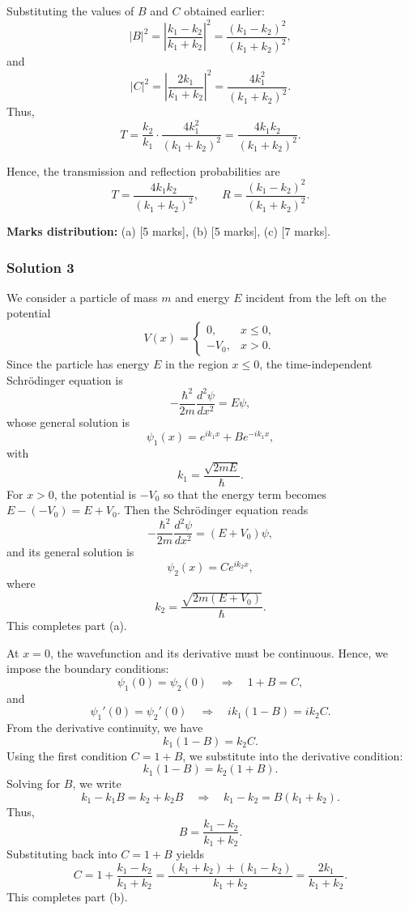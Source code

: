 \documentclass{article}
\begin{document}
Substituting the values of \(B\) and \(C\) obtained earlier:
\[
|B|^2 = \left|\frac{k_1-k_2}{k_1+k_2}\right|^2 = \frac{(k_1-k_2)^2}{(k_1+k_2)^2},
\]
and
\[
|C|^2 = \left|\frac{2k_1}{k_1+k_2}\right|^2 = \frac{4k_1^2}{(k_1+k_2)^2}.
\]
Thus,
\[
T = \frac{k_2}{k_1}\cdot\frac{4k_1^2}{(k_1+k_2)^2} = \frac{4k_1k_2}{(k_1+k_2)^2}.
\]

Hence, the transmission and reflection probabilities are
\[
T = \frac{4k_1k_2}{(k_1+k_2)^2}, \qquad R = \frac{(k_1-k_2)^2}{(k_1+k_2)^2}.
\]

\textbf{Marks distribution:} \quad (a) [5 marks], (b) [5 marks], (c) [7 marks].

\subsubsection{Solution 3}

We consider a particle of mass \( m \) and energy \( E \) incident from the left on the potential
\[
V(x)=
\begin{cases}
0, & x\le 0,\\[1mm]
-V_0, & x>0.
\end{cases}
\]
Since the particle has energy \( E \) in the region \( x\le 0 \), the time-independent Schrödinger equation is
\[
-\frac{\hbar^2}{2m}\frac{d^2\psi}{dx^2} = E\psi,
\]
whose general solution is
\[
\psi_1(x)=e^{ik_1x}+Be^{-ik_1x},
\]
with
\[
k_1 = \frac{\sqrt{2mE}}{\hbar}.
\]
For \( x>0 \), the potential is \( -V_0 \) so that the energy term becomes \( E - (-V_0)=E+V_0 \). Then the Schrödinger equation reads
\[
-\frac{\hbar^2}{2m}\frac{d^2\psi}{dx^2} = (E+V_0)\psi,
\]
and its general solution is
\[
\psi_2(x)=Ce^{ik_2x},
\]
where
\[
k_2 = \frac{\sqrt{2m(E+V_0)}}{\hbar}.
\]
This completes part (a).

\vspace{2mm}

At \( x=0 \), the wavefunction and its derivative must be continuous. Hence, we impose the boundary conditions:
\[
\psi_1(0)=\psi_2(0) \quad \Longrightarrow \quad 1+B=C,
\]
and
\[
\psi_1'(0)=\psi_2'(0) \quad \Longrightarrow \quad ik_1(1-B)=ik_2C.
\]
From the derivative continuity, we have
\[
k_1(1-B)=k_2C.
\]
Using the first condition \( C=1+B \), we substitute into the derivative condition:
\[
k_1(1-B)=k_2(1+B).
\]
Solving for \( B \), we write
\[
k_1 - k_1 B = k_2 + k_2B \quad \Longrightarrow \quad k_1 - k_2 = B(k_1+k_2).
\]
Thus,
\[
B=\frac{k_1-k_2}{k_1+k_2}.
\]
Substituting back into \( C=1+B \) yields
\[
C=1+\frac{k_1-k_2}{k_1+k_2}=\frac{(k_1+k_2)+(k_1-k_2)}{k_1+k_2}=\frac{2k_1}{k_1+k_2}.
\]
This completes part (b).
\end{document}
